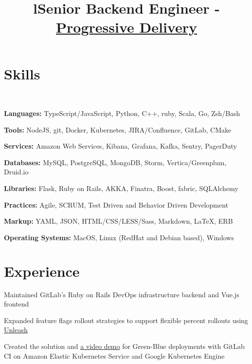 \documentclass[12pt, tweaklist, line]{res}
\title{l}\dates{r}\\
\let\tempone\itemize
\let\temptwo\enditemize
\renewenvironment{itemize}{\tempone\vspace{-.15in}\setlength{\topsep}{0pt}\setlength{\itemsep}{3pt}\vspace{-.15in}}{\temptwo}
\def\Cplusplus{C++}
\begin{document}

\begin{resume}

\section{Skills}

~\\ %

\begin{itemize}
\item \textbf{Languages:} TypeScript/JavaScript, Python, \Cplusplus, ruby, Scala, Go, Zsh/Bash
\item \textbf{Tools:} NodeJS, git, Docker, Kubernetes, JIRA/Confluence, GitLab, CMake
\item \textbf{Services:} Amazon Web Services, Kibana, Grafana, Kafka, Sentry, PagerDuty
\item \textbf{Databases:} MySQL, PostgreSQL, MongoDB, Storm, Vertica/Greenplum, Druid.io
\item \textbf{Libraries:} Flask, Ruby on Rails, AKKA, Finatra, Boost, fabric, SQLAlchemy
\item \textbf{Practices:} Agile, SCRUM, Test Driven and Behavior Driven Development
\item \textbf{Markup:} YAML, JSON, HTML/CSS/LESS/Sass, Markdown, \LaTeX, ERB
\item \textbf{Operating Systems:} MacOS, Linux (RedHat and Debian based), Windows
\end{itemize}

\section{Experience}

\title{Senior Backend Engineer - \href{https://about.gitlab.com/handbook/engineering/development/ops/release/progressive-delivery/}{Progressive Delivery}}
\begin{position}
\begin{itemize}
\item Maintained GitLab's Ruby on Rails DevOps infrastructure backend and Vue.js frontend
\item Expanded feature flags rollout strategies to support flexible percent rollouts using \href{https://unleash.github.io/}{Unleash}
\item Created the solution and \href{https://www.youtube.com/watch?v=ymgwt2NUbd4}{a video demo} for Green-Blue deployments with GitLab CI on Amazon Elastic Kubernetes Service and Google Kubernetes Engine
\end{itemize}
\end{position}


\end{resume}
\end{document}
